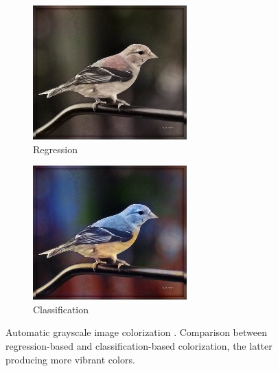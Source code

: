 \begin{figure}[t]
\begin{subfigure}[b]{0.244\textwidth}
  \end{subfigure}
  \hfill
  \begin{subfigure}[b]{0.244\textwidth}
    \includegraphics[width=\textwidth]{gfx/app-color-3}
    \caption{Regression}
  \end{subfigure}
  \begin{subfigure}[b]{0.244\textwidth}
    \includegraphics[width=\textwidth]{gfx/app-color-4}
    \caption{Classification}
  \end{subfigure}
  \caption{
    Automatic grayscale image colorization \cite{Zhang2016}.
    Comparison between regression-based and classification-based colorization, the latter producing more vibrant colors.
  }
  \label{sec:applications:beyond:color}
\end{figure}

